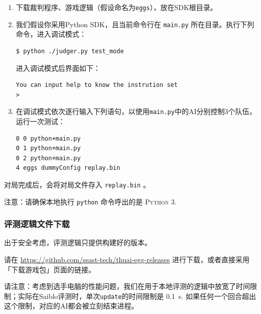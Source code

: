 \documentclass[UTF8]{article}
\begin{document}
\begin{enumerate}

\item 下载裁判程序、游戏逻辑（假设命名为\texttt{eggs}），放在SDK根目录。
\item 我们假设你采用Python SDK，且当前命令行在 \texttt{main.py} 所在目录。执行下列命令，进入调试模式：

\begin{lstlisting}[language=bash]
$ python ./judger.py test_mode
\end{lstlisting}
进入调试模式后界面如下：
\begin{lstlisting}
You can input help to know the instrution set
> 
\end{lstlisting}

\item 在调试模式依次逐行输入下列语句，以使用\texttt{main.py}中的AI分别控制3个队伍，运行一次测试：
\begin{lstlisting}
0 0 python+main.py
0 1 python+main.py
0 2 python+main.py
4 eggs dummyConfig replay.bin
\end{lstlisting}
\end{enumerate}

对局完成后，会将对局文件存入 \texttt{replay.bin} 。

注意：请确保本地执行 \texttt{python} 命令呼出的是 \textsc{Python 3}.

\hypertarget{header-n58}{%
\subsubsection{评测逻辑文件下载}\label{header-n58}}

出于安全考虑，评测逻辑只提供构建好的版本。\par 请在
\url{https://github.com/ssast-tech/thuai-egg-releases}
进行下载，或者直接采用「下载游戏包」页面的链接。

请注意：考虑到选手电脑的性能问题，我们在用于本地评测的逻辑中放宽了时间限制；实际在Saiblo评测时，单次\texttt{update}的时间限制是 \SI{0.1}{\second}. 如果任何一个回合超出这个限制，对应的AI都会被立刻结束进程。
\end{document}

